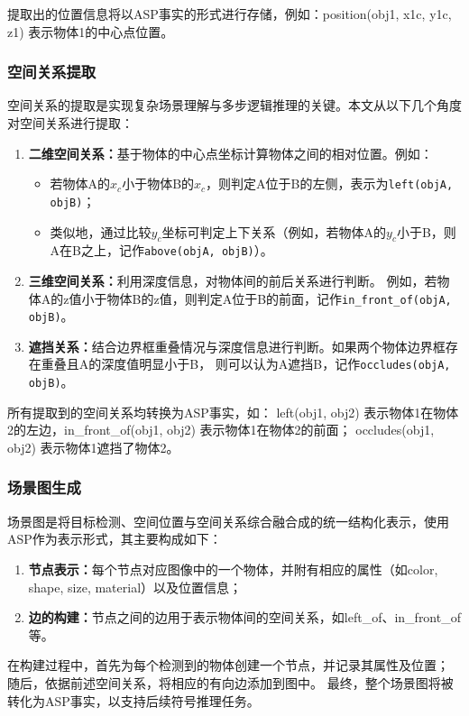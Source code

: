 提取出的位置信息将以ASP事实的形式进行存储，例如：position(obj1, x1c, y1c, z1) 表示物体1的中心点位置。
\subsubsection{空间关系提取}
空间关系的提取是实现复杂场景理解与多步逻辑推理的关键。本文从以下几个角度对空间关系进行提取：
\begin{enumerate}[nosep]
\item \textbf{二维空间关系：}基于物体的中心点坐标计算物体之间的相对位置。例如： 
    \begin{itemize}[leftmargin=2em] 
        \item 若物体A的$x_c$小于物体B的$x_c$，则判定A位于B的左侧，表示为\texttt{left(objA, objB)}； 
        \item 类似地，通过比较$y_c$坐标可判定上下关系（例如，若物体A的$y_c$小于B，则A在B之上，记作\texttt{above(objA, objB)}）。 
    \end{itemize} 
\item \textbf{三维空间关系：}利用深度信息，对物体间的前后关系进行判断。
例如，若物体A的z值小于物体B的z值，则判定A位于B的前面，记作\texttt{in\_front\_of(objA, objB)}。 
\item \textbf{遮挡关系：}结合边界框重叠情况与深度信息进行判断。如果两个物体边界框存在重叠且A的深度值明显小于B，
则可以认为A遮挡B，记作\texttt{occludes(objA, objB)}。 
\end{enumerate}
所有提取到的空间关系均转换为ASP事实，如：
left(obj1, obj2) 表示物体1在物体2的左边，in\_front\_of(obj1, obj2) 表示物体1在物体2的前面；
occludes(obj1, obj2) 表示物体1遮挡了物体2。
\subsubsection{场景图生成}
场景图是将目标检测、空间位置与空间关系综合融合成的统一结构化表示，使用ASP作为表示形式，其主要构成如下： 
\begin{enumerate}[nosep] 
    \item \textbf{节点表示：}每个节点对应图像中的一个物体，并附有相应的属性（如color, shape, size, material）以及位置信息； 
    \item \textbf{边的构建：}节点之间的边用于表示物体间的空间关系，如left\_of、in\_front\_of等。 
\end{enumerate}

在构建过程中，首先为每个检测到的物体创建一个节点，并记录其属性及位置；
随后，依据前述空间关系，将相应的有向边添加到图中。
最终，整个场景图将被转化为ASP事实，以支持后续符号推理任务。
